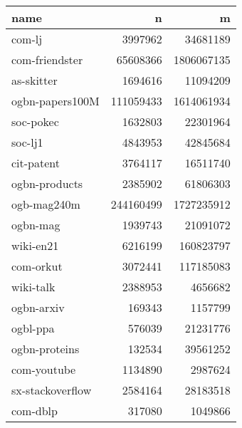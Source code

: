 \begin{tabular}{lrr}
\toprule
name & n & m \\
\midrule
com-lj & 3997962 & 34681189 \\
com-friendster & 65608366 & 1806067135 \\
as-skitter & 1694616 & 11094209 \\
ogbn-papers100M & 111059433 & 1614061934 \\
soc-pokec & 1632803 & 22301964 \\
soc-lj1 & 4843953 & 42845684 \\
cit-patent & 3764117 & 16511740 \\
ogbn-products & 2385902 & 61806303 \\
ogb-mag240m & 244160499 & 1727235912 \\
ogbn-mag & 1939743 & 21091072 \\
wiki-en21 & 6216199 & 160823797 \\
com-orkut & 3072441 & 117185083 \\
wiki-talk & 2388953 & 4656682 \\
ogbn-arxiv & 169343 & 1157799 \\
ogbl-ppa & 576039 & 21231776 \\
ogbn-proteins & 132534 & 39561252 \\
com-youtube & 1134890 & 2987624 \\
sx-stackoverflow & 2584164 & 28183518 \\
com-dblp & 317080 & 1049866 \\
\bottomrule
\end{tabular}
